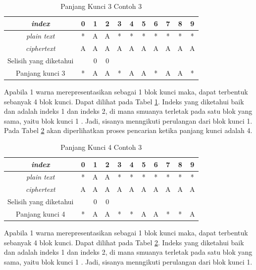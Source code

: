 	\begin{table}[H]
	 	\centering
	 	\caption{Panjang Kunci 3 Contoh 3}
	 	\setlength{\arrayrulewidth}{.08em}
	 	\begin{tabular}{|c|c|c|c|c|c|c|c|c|c|c|}\hline
	 	\textit{index}&0&1&2&3&4&5&6&7&8&9\\ \hline
	 	\textit{plain text}&\cellcolor{blue!15}*&\cellcolor{blue!15}A&\cellcolor{blue!15}A&\cellcolor{blue!15}*&\cellcolor{green!15}*&\cellcolor{green!15}*&\cellcolor{green!15}*&\cellcolor{green!15}*&\cellcolor{violet!30}*&\cellcolor{violet!30}*\\ \hline
	 	\textit{ciphertext}&\cellcolor{blue!15}A&\cellcolor{blue!15}A&\cellcolor{blue!15}A&\cellcolor{blue!15}A&\cellcolor{green!15}A&\cellcolor{green!15}A&\cellcolor{green!15}A&\cellcolor{green!15}A&\cellcolor{violet!30}A&\cellcolor{violet!30}A\\ \hline
		Selisih yang diketahui & &0&0& & & & & & & \\ \hline	
		Panjang kunci 3 &*&A&A&*&A&A&*&A&A&*\\ \hline 	
	 	\end{tabular}
	 	\label{tab:k3contoh3}
	\end{table}
	Apabila 1 warna merepresentasikan sebagai 1 blok kunci maka, dapat terbentuk sebanyak 4 blok kunci. Dapat dilihat pada Tabel \ref{tab:k3contoh3}. Indeks yang diketahui baik \plaintext dan \ciphertext adalah indeks 1 dan indeks 2, di mana smuanya terletak pada satu blok yang sama, yaitu blok kunci 1 . Jadi, sisanya menngikuti perulangan dari blok kunci 1. 
	\\
	Pada Tabel \ref{tab:k4contoh3} akan diperlihatkan proses pencarian ketika panjang kunci adalah 4.
	\begin{table}[H]
	 	\centering
	 	\caption{Panjang Kunci 4 Contoh 3}
	 	\setlength{\arrayrulewidth}{.08em}
	 	\begin{tabular}{|c|c|c|c|c|c|c|c|c|c|c|}\hline
	 	\textit{index}&0&1&2&3&4&5&6&7&8&9\\ \hline
	 	\textit{plain text}&\cellcolor{blue!15}*&\cellcolor{blue!15}A&\cellcolor{blue!15}A&\cellcolor{green!15}*&\cellcolor{green!15}*&\cellcolor{green!15}*&\cellcolor{violet!30}*&\cellcolor{violet!30}*&\cellcolor{violet!30}*&\cellcolor{purple!25}*\\ \hline
	 	\textit{ciphertext}&\cellcolor{blue!15}A&\cellcolor{blue!15}A&\cellcolor{blue!15}A&\cellcolor{green!15}A&\cellcolor{green!15}A&\cellcolor{green!15}A&\cellcolor{violet!30}A&\cellcolor{violet!30}A&\cellcolor{violet!30}A&\cellcolor{purple!25}A\\ \hline
		Selisih yang diketahui & &0&0& & & & & & & \\ \hline	
		Panjang kunci 4 &*&A&A&*&*&A&A&*&*&A\\ \hline 	
	 	\end{tabular}
	 	\label{tab:k4contoh3}
	\end{table}
	Apabila 1 warna merepresentasikan sebagai 1 blok kunci maka, dapat terbentuk sebanyak 4 blok kunci. Dapat dilihat pada Tabel \ref{tab:k4contoh3}. Indeks yang diketahui baik \plaintext dan \ciphertext adalah indeks 1 dan indeks 2, di mana smuanya terletak pada satu blok yang sama, yaitu blok kunci 1 . Jadi, sisanya menngikuti perulangan dari blok kunci 1. 
	
